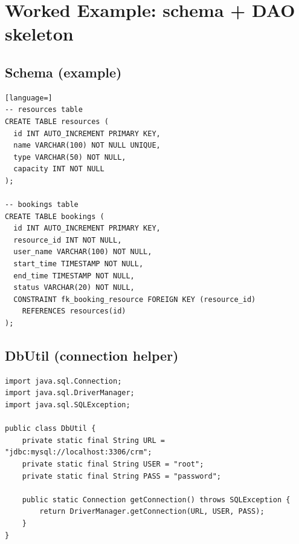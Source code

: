 \documentclass[11pt]{article}
\begin{document}
\section{Worked Example: schema + DAO skeleton}
\subsection*{Schema (example)}
\begin{lstlisting}[language=]
-- resources table
CREATE TABLE resources (
  id INT AUTO_INCREMENT PRIMARY KEY,
  name VARCHAR(100) NOT NULL UNIQUE,
  type VARCHAR(50) NOT NULL,
  capacity INT NOT NULL
);

-- bookings table
CREATE TABLE bookings (
  id INT AUTO_INCREMENT PRIMARY KEY,
  resource_id INT NOT NULL,
  user_name VARCHAR(100) NOT NULL,
  start_time TIMESTAMP NOT NULL,
  end_time TIMESTAMP NOT NULL,
  status VARCHAR(20) NOT NULL,
  CONSTRAINT fk_booking_resource FOREIGN KEY (resource_id)
    REFERENCES resources(id)
);
\end{lstlisting}

\subsection*{DbUtil (connection helper)}
\begin{lstlisting}
import java.sql.Connection;
import java.sql.DriverManager;
import java.sql.SQLException;

public class DbUtil {
    private static final String URL = "jdbc:mysql://localhost:3306/crm";
    private static final String USER = "root";
    private static final String PASS = "password";

    public static Connection getConnection() throws SQLException {
        return DriverManager.getConnection(URL, USER, PASS);
    }
}
\end{lstlisting}
\end{document}
